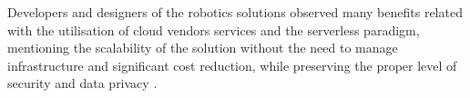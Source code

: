 Developers and designers of the robotics solutions observed many benefits related with the utilisation of cloud vendors services and the serverless paradigm, mentioning the scalability of the solution without the need to manage infrastructure and significant cost reduction, while preserving the proper level of security and data privacy \cite{AWSIRobotIoT}.






